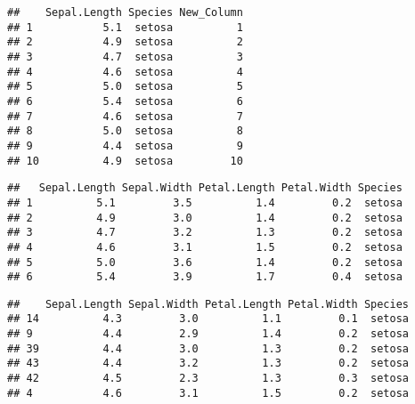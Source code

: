\documentclass[
]{article}
\newenvironment{Shaded}{\begin{snugshade}}{\end{snugshade}}
\newcommand{\CommentTok}[1]{\textcolor[rgb]{0.56,0.35,0.01}{\textit{#1}}}
\newcommand{\FunctionTok}[1]{\textcolor[rgb]{0.13,0.29,0.53}{\textbf{#1}}}
\newcommand{\NormalTok}[1]{#1}
\newcommand{\OtherTok}[1]{\textcolor[rgb]{0.56,0.35,0.01}{#1}}
\newcommand{\SpecialCharTok}[1]{\textcolor[rgb]{0.81,0.36,0.00}{\textbf{#1}}}
\newcommand{\StringTok}[1]{\textcolor[rgb]{0.31,0.60,0.02}{#1}}
\begin{document}
\begin{verbatim}
##    Sepal.Length Species New_Column
## 1           5.1  setosa          1
## 2           4.9  setosa          2
## 3           4.7  setosa          3
## 4           4.6  setosa          4
## 5           5.0  setosa          5
## 6           5.4  setosa          6
## 7           4.6  setosa          7
## 8           5.0  setosa          8
## 9           4.4  setosa          9
## 10          4.9  setosa         10
\end{verbatim}

\begin{Shaded}
\end{Shaded}

\begin{verbatim}
##   Sepal.Length Sepal.Width Petal.Length Petal.Width Species
## 1          5.1         3.5          1.4         0.2  setosa
## 2          4.9         3.0          1.4         0.2  setosa
## 3          4.7         3.2          1.3         0.2  setosa
## 4          4.6         3.1          1.5         0.2  setosa
## 5          5.0         3.6          1.4         0.2  setosa
## 6          5.4         3.9          1.7         0.4  setosa
\end{verbatim}

\begin{Shaded}
\end{Shaded}

\begin{verbatim}
##    Sepal.Length Sepal.Width Petal.Length Petal.Width Species
## 14          4.3         3.0          1.1         0.1  setosa
## 9           4.4         2.9          1.4         0.2  setosa
## 39          4.4         3.0          1.3         0.2  setosa
## 43          4.4         3.2          1.3         0.2  setosa
## 42          4.5         2.3          1.3         0.3  setosa
## 4           4.6         3.1          1.5         0.2  setosa
\end{verbatim}
\end{document}
